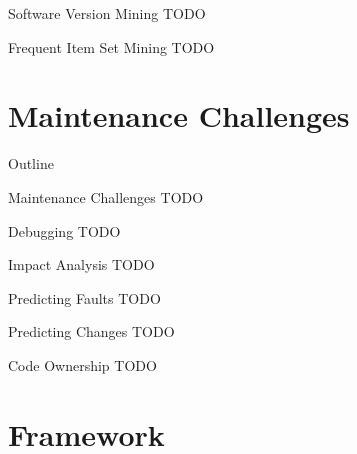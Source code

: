 \begin{frame}{Software Version Mining}
  TODO
\end{frame}


\begin{frame}{Frequent Item Set Mining}
  TODO
\end{frame}



\section{Maintenance Challenges}

\begin{frame}{Outline}
  \tableofcontents[current]
\end{frame}


\begin{frame}{Maintenance Challenges}
  TODO
\end{frame}


\begin{frame}{Debugging}
  TODO
\end{frame}


\begin{frame}{Impact Analysis}
  TODO
\end{frame}


\begin{frame}{Predicting Faults}
  TODO
\end{frame}


\begin{frame}{Predicting Changes}
  TODO
\end{frame}


\begin{frame}{Code Ownership}
  TODO
\end{frame}



\section{Framework}


